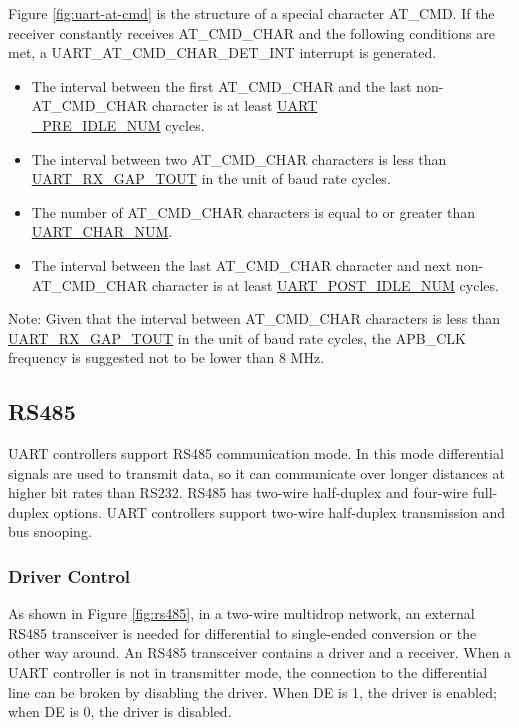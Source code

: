 \documentclass[main\_\_EN.tex]{subfiles}
\begin{document}
Figure \ref{fig:uart-at-cmd} is the structure of a special character AT\_CMD. If the receiver constantly receives AT\_CMD\_CHAR and the following conditions are met, a UART\_AT\_CMD\_CHAR\_DET\_INT interrupt is generated.

\begin{itemize}
    \item The interval between the first AT\_CMD\_CHAR and the last non-AT\_CMD\_CHAR character is at least \hyperref[fielddesc:UARTPREIDLENUM]{UART\\\_PRE\_IDLE\_NUM} cycles.
    \item The interval between two AT\_CMD\_CHAR characters is less than \hyperref[fielddesc:UARTRXGAPTOUT]{UART\_RX\_GAP\_TOUT} in the unit of baud rate cycles.
    \item The number of AT\_CMD\_CHAR characters is equal to or greater than \hyperref[fielddesc:UARTCHARNUM]{UART\_CHAR\_NUM}.
    \item The interval between the last AT\_CMD\_CHAR character and next non-AT\_CMD\_CHAR character is at least \hyperref[fielddesc:UARTPOSTIDLENUM]{UART\_POST\_IDLE\_NUM} cycles.
\end{itemize}

Note: Given that the interval between AT\_CMD\_CHAR characters is less than \hyperref[fielddesc:UARTRXGAPTOUT]{UART\_RX\_GAP\_TOUT} in the unit of baud rate cycles, the APB\_CLK frequency is suggested not to be lower than 8 MHz.

\subsection{RS485}

UART controllers support RS485 communication mode. In this mode differential signals are used to transmit data, so it can communicate over longer distances at higher bit rates than RS232. RS485 has two-wire half-duplex and four-wire full-duplex options. UART controllers support two-wire half-duplex transmission and bus snooping.


\subsubsection{Driver Control}

As shown in Figure \ref{fig:rs485}, in a two-wire multidrop network, an external RS485 transceiver is needed for differential to single-ended conversion or the other way around. An RS485 transceiver contains a driver and a receiver. When a UART controller is not in transmitter mode, the connection to the differential line can be broken by disabling the driver. When DE is 1, the driver is enabled; when DE is 0, the driver is disabled.
\end{document}
